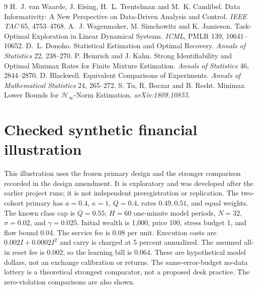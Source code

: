 \begin{thebibliography}{9}\small
{} H.~J. van Waarde, J. Eising,
H.~L. Trentelman and M.~K. Camlibel. Data Informativity: A New Perspective on
Data-Driven Analysis and Control. \emph{IEEE TAC} 65, 4753--4768.
 A.~J. Wagenmaker,
M. Simchowitz and K. Jamieson. Task-Optimal Exploration in Linear Dynamical
Systems. \emph{ICML}, PMLR 139, 10641--10652.
 D.~L. Donoho. Statistical Estimation and
Optimal Recovery. \emph{Annals of Statistics} 22, 238--270.
 P. Heinrich and J. Kahn.
Strong Identifiability and Optimal Minimax Rates for Finite Mixture Estimation.
\emph{Annals of Statistics} 46, 2844--2870.
 D. Blackwell. Equivalent Comparisons
of Experiments. \emph{Annals of Mathematical Statistics} 24, 265--272.
 S. Tu, R. Boczar and B. Recht.
Minimax Lower Bounds for $\mathcal H_\infty$-Norm Estimation.
\emph{arXiv:1809.10855}.
\end{thebibliography}

\section*{Checked synthetic financial illustration}
This illustration uses the frozen primary design and the stronger comparison
recorded in the design amendment. It is exploratory and was developed after
the earlier project runs; it is not independent preregistration or replication.
The two-cohort primary has $a=0.4$, $\kappa=1$, $Q=0.4$, rates
$0.49,0.51$, and equal weights. The known class cap is $\overline Q=0.55$;
$H=60$ one-minute model periods, $N=32$, $\sigma=0.02$, and
$\gamma=0.025$. Initial wealth is 1,000, price 100, stress budget 1,
and flow bound 0.04. The service fee is 0.08 per unit. Execution costs are
$0.002I+0.0002I^2$ and carry is charged at 5 percent annualized.
The assumed all-in reset fee is 0.002, so the learning bill is 0.064.
These are hypothetical model dollars, not an exchange calibration or returns.
The same-error-budget no-data lottery is a theoretical strongest comparator,
not a proposed desk practice. The zero-violation comparisons are also shown.

